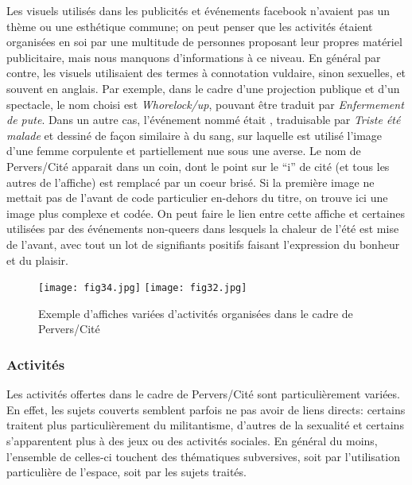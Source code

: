 Les visuels utilisés dans les publicités et événements facebook n'avaient pas un thème ou une esthétique commune; on peut penser que les activités étaient organisées en soi par une multitude de personnes proposant leur propres matériel publicitaire, mais nous manquons d'informations à ce niveau.
En général par contre, les visuels utilisaient des termes à connotation vuldaire, sinon sexuelles, et souvent en anglais.
Par exemple, dans le cadre d'une projection publique et d'un spectacle, le nom choisi est \emph{Whorelock/up}, pouvant être traduit par \emph{Enfermement de pute}.
Dans un autre cas, l'événement nommé était , traduisable par \emph{Triste été malade} et dessiné de façon similaire à du sang, sur laquelle est utilisé l'image d'une femme corpulente et partiellement nue sous une averse.
Le nom de Pervers/Cité apparait dans un coin, dont le point sur le \enquote{i} de cité (et tous les autres de l'affiche) est remplacé par un coeur brisé.
Si la première image ne mettait pas de l'avant de code particulier en-dehors du titre, on trouve ici une image plus complexe et codée.
On peut faire le lien entre cette affiche et certaines utilisées par des événements non-queers dans lesquels la chaleur de l'été est mise de l'avant, avec tout un lot de signifiants positifs faisant l'expression du bonheur et du plaisir.

\begin{figure}
\centering
{}
{\texttt{[image: fig34.jpg]}}
{\texttt{[image: fig32.jpg]}}
\caption{Exemple d'affiches variées d'activités organisées dans le cadre de Pervers/Cité}\label{figs3132}
\end{figure}

\subsubsection{Activités}
\label{subsec:activitesperverscite}
Les activités offertes dans le cadre de Pervers/Cité sont particulièrement variées.
En effet, les sujets couverts semblent parfois ne pas avoir de liens directs: certains traitent plus particulièrement du militantisme, d'autres de la sexualité et certains s'apparentent plus à des jeux ou des activités sociales.
En général du moins, l'ensemble de celles-ci touchent des thématiques subversives, soit par l'utilisation particulière de l'espace, soit par les sujets traités.

